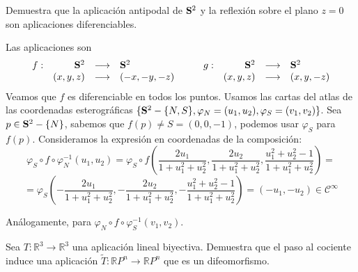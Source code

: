 \begin{ejer}
    [1.17] Demuestra que la aplicaci\'on antipodal de $\bold S ^2$ y la reflexi\'on sobre el plano $z = 0$ son aplicaciones diferenciables.
\end{ejer}
\begin{sol}
    Las aplicaciones son
    $$\begin{array}{rrcl}
         f: & \bold S ^2 & \longrightarrow & \bold S ^2 \\
         & (x,y,z) & \longrightarrow & (-x,-y,-z) 
    \end{array} \qquad \begin{array}{rrcl}
         g: & \bold S ^2 & \longrightarrow & \bold S ^2 \\
         & (x,y,z) & \longrightarrow & (x,y,-z) 
    \end{array}$$
    Veamos que $f$ es diferenciable en todos los puntos. Usamos las cartas del atlas de las coordenadas esterogr\'aficas $\{\bold S ^2-\{N,S\}, \varphi_{N}=(u_1,u_2), \varphi_S=(v_1,v_2)\}$. Sea $p \in \bold S ^2-\{N\}$, sabemos que $f(p) \neq S=(0,0,-1)$, podemos usar $\varphi_S$ para $f(p)$. Consideramos la expresi\'on en coordenadas de la composici\'on:
    $$\varphi_S \circ f \circ \varphi_N^{-1} (u_1, u_2)= \varphi_S \circ f \left( \dfrac{2u_1}{1+u_1^2+u_2^2}, \dfrac{2u_2}{1+u_1^2+u_2^2}, \dfrac{u_1^2+u_2^2-1}{1+u_1^2+u_2^2} \right) =  $$
    $$= \varphi_S \left(- \dfrac{2u_1}{1+u_1^2+u_2^2}, -\dfrac{2u_2}{1+u_1^2+u_2^2}, -\dfrac{u_1^2+u_2^2-1}{1+u_1^2+u_2^2} \right) = \left(-u_1, -u_2 \right) \in \mathcal{C}^{\infty}$$

    An\'alogamente, para $\varphi_N \circ f \circ \varphi_S^{-1}(v_1,v_2)$.
\end{sol}
\begin{ejer} [1.20]
    Sea $T : \mathbb R^3 \to \mathbb R^3$ una aplicaci\'on lineal biyectiva. Demuestra que el paso al
cociente induce una aplicaci\'on $\tilde{T} : \mathbb RP^n \to \mathbb RP^n$ que es un difeomorfismo.
\end{ejer}
